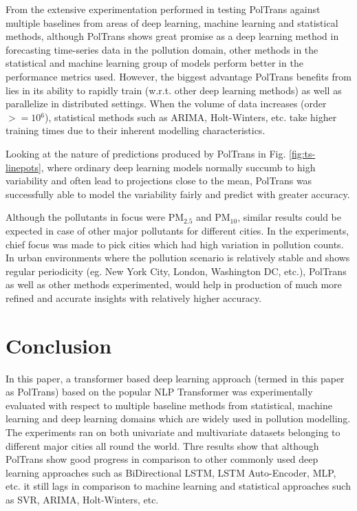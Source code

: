 \documentclass[10pt,journal]{IEEEtran}
\begin{document}
From the extensive experimentation performed in testing {PolTrans} against multiple baselines from areas of deep learning, machine learning and statistical methods,  although {PolTrans} shows great promise as a deep learning method in forecasting time-series data in the pollution domain, other methods in the statistical and machine learning group of models perform better in the performance metrics used. However, the biggest advantage {PolTrans} benefits from lies in its ability to rapidly train (w.r.t. other deep learning methods) as well as parallelize in distributed settings. When the volume of data increases (order ${>= 10{^{6}}}$),  statistical methods such as ARIMA, Holt-Winters, etc. take higher training times due to their inherent modelling characteristics.

Looking at the nature of predictions produced by {PolTrans} in Fig. \ref{fig:ts-linepots},  where ordinary deep learning models normally succumb to high variability and often lead to projections close to the mean, {PolTrans} was successfully able to model the variability fairly and predict with greater accuracy.

Although the pollutants in focus were PM${_{2.5}}$ and PM${_{10}}$, similar results could be expected in case of other major pollutants for different cities. In the experiments, chief focus was made to pick cities which had high variation in pollution counts. In urban environments where the pollution scenario is relatively stable and shows regular periodicity (eg. New York City, London, Washington DC, etc.), {PolTrans} as well as other methods experimented, would help in production of much more refined and accurate insights with relatively higher accuracy. 

\section{Conclusion}
\label{sec:conclusion}

In this paper, a transformer based deep learning approach (termed in this paper as {PolTrans}) based on the popular NLP Transformer was experimentally evaluated with respect to multiple baseline methods from statistical, machine learning and deep learning domains which are widely used in pollution modelling. The experiments ran on both univariate and multivariate datasets belonging to different major cities all round the world. Thre results show that although {PolTrans} show good progress in comparison to other commonly used deep learning approaches such as BiDirectional LSTM, LSTM Auto-Encoder, MLP, etc. it still lags in comparison to machine learning and statistical approaches such as SVR, ARIMA, Holt-Winters, etc. 
\end{document}
